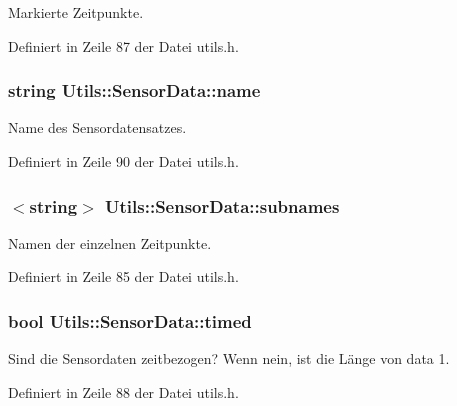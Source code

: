 Markierte Zeitpunkte. 



Definiert in Zeile 87 der Datei utils.\-h.

\hypertarget{structUtils_1_1SensorData_a52474d0fe0dce0d3ee73c007a150a507}{
\subsubsection[{name}]{\setlength{\rightskip}{0pt plus 5cm}string Utils\-::\-Sensor\-Data\-::name}}\label{structUtils_1_1SensorData_a52474d0fe0dce0d3ee73c007a150a507}


Name des Sensordatensatzes. 



Definiert in Zeile 90 der Datei utils.\-h.

\hypertarget{structUtils_1_1SensorData_ad5875ab7e8ebdc9dc41a7b9ef1c063ba}{
\subsubsection[{subnames}]{$<$string$>$ Utils\-::\-Sensor\-Data\-::subnames}}\label{structUtils_1_1SensorData_ad5875ab7e8ebdc9dc41a7b9ef1c063ba}


Namen der einzelnen Zeitpunkte. 



Definiert in Zeile 85 der Datei utils.\-h.

\hypertarget{structUtils_1_1SensorData_aca94c3ec7e8f2e719f7cfcff4e9da41b}{
\subsubsection[{timed}]{\setlength{\rightskip}{0pt plus 5cm}bool Utils\-::\-Sensor\-Data\-::timed}}\label{structUtils_1_1SensorData_aca94c3ec7e8f2e719f7cfcff4e9da41b}


Sind die Sensordaten zeitbezogen? Wenn nein, ist die Länge von data 1. 



Definiert in Zeile 88 der Datei utils.\-h.

